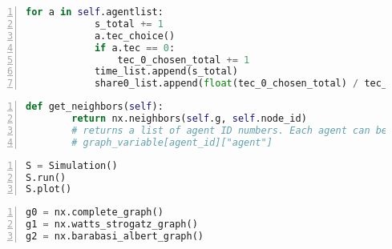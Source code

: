\documentclass[25pt,a4paper]{article}
\begin{document}
\begin{lstlisting}[language=Python,frame=single,numbers=left,title=Script: Possibility for time iteration (e.g. in a run method of the Simulation class)]
        for a in self.agentlist:
            s_total += 1
            a.tec_choice()
            if a.tec == 0:
                tec_0_chosen_total += 1
            time_list.append(s_total)
            share0_list.append(float(tec_0_chosen_total) / tec_chosen_total)
\end{lstlisting}
\normalsize

\begin{lstlisting}[language=Python,frame=single,numbers=left,title=Script: Possibility for a method for collecting an agent's neighbors' ID numbers for the Agent class]
    def get_neighbors(self):
        return nx.neighbors(self.g, self.node_id)
        # returns a list of agent ID numbers. Each agent can be accessed by:
        # graph_variable[agent_id]["agent"]
\end{lstlisting}
\normalsize

\begin{lstlisting}[language=Python,frame=single,numbers=left,title=Script: Possibility for creating; running; and plotting the simulation (using the Simulation class and methods above)]
S = Simulation()
S.run()
S.plot()
\end{lstlisting}
\normalsize

\begin{lstlisting}[language=Python,frame=single,numbers=left,title=Script: Network generating commands for complete graphs; multiple-ring network structures; and preferential attachment networks]
g0 = nx.complete_graph()
g1 = nx.watts_strogatz_graph()
g2 = nx.barabasi_albert_graph()
\end{lstlisting}
\normalsize
\end{document}
